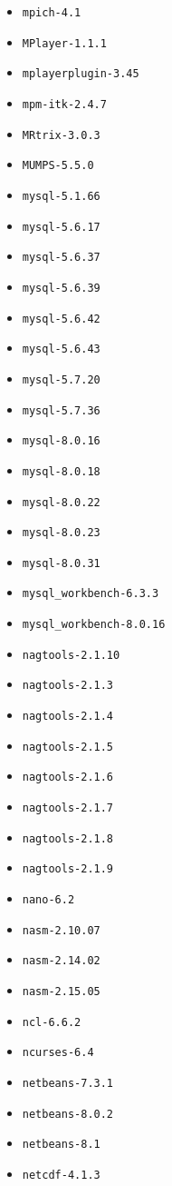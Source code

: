 \begin{multicols}{3}
\begin{itemize}
\item \verb|mpich-4.1|
\item \verb|MPlayer-1.1.1|
\item \verb|mplayerplugin-3.45|
\item \verb|mpm-itk-2.4.7|
\item \verb|MRtrix-3.0.3|
\item \verb|MUMPS-5.5.0|
\item \verb|mysql-5.1.66|
\item \verb|mysql-5.6.17|
\item \verb|mysql-5.6.37|
\item \verb|mysql-5.6.39|
\item \verb|mysql-5.6.42|
\item \verb|mysql-5.6.43|
\item \verb|mysql-5.7.20|
\item \verb|mysql-5.7.36|
\item \verb|mysql-8.0.16|
\item \verb|mysql-8.0.18|
\item \verb|mysql-8.0.22|
\item \verb|mysql-8.0.23|
\item \verb|mysql-8.0.31|
\item \verb|mysql_workbench-6.3.3|
\item \verb|mysql_workbench-8.0.16|
\item \verb|nagtools-2.1.10|
\item \verb|nagtools-2.1.3|
\item \verb|nagtools-2.1.4|
\item \verb|nagtools-2.1.5|
\item \verb|nagtools-2.1.6|
\item \verb|nagtools-2.1.7|
\item \verb|nagtools-2.1.8|
\item \verb|nagtools-2.1.9|
\item \verb|nano-6.2|
\item \verb|nasm-2.10.07|
\item \verb|nasm-2.14.02|
\item \verb|nasm-2.15.05|
\item \verb|ncl-6.6.2|
\item \verb|ncurses-6.4|
\item \verb|netbeans-7.3.1|
\item \verb|netbeans-8.0.2|
\item \verb|netbeans-8.1|
\item \verb|netcdf-4.1.3|

\end{itemize}
\end{multicols}
